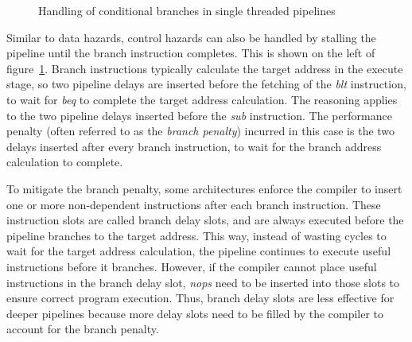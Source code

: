 \begin{figure}
\begin{center}
\noindent{}
\end{center}
\vspace{-3mm}
\caption{Handling of conditional branches in single threaded pipelines}
\label{fig:branch_execution_non_interleaved_pipeline}
\end{figure}

Similar to data hazards, control hazards can also be handled by stalling the pipeline until the branch instruction completes. 
This is shown on the left of figure~\ref{fig:branch_execution_non_interleaved_pipeline}. 
Branch instructions typically calculate the target address in the execute stage, so two pipeline delays are inserted before the fetching of the \emph{blt} instruction, to wait for \emph{beq} to complete the target address calculation. 
The reasoning applies to the two pipeline delays inserted before the \emph{sub} instruction. 
The performance penalty (often referred to as the \emph{branch penalty}) incurred in this case is the two delays inserted after every branch instruction, to wait for the branch address calculation to complete.

To mitigate the branch penalty, some architectures enforce the compiler to insert one or more non-dependent instructions after each branch instruction.
These instruction slots are called branch delay slots, and are always executed before the pipeline branches to the target address. 
This way, instead of wasting cycles to wait for the target address calculation, the pipeline continues to execute useful instructions before it branches.
However, if the compiler cannot place useful instructions in the branch delay slot, \emph{nops} need to be inserted into those slots to ensure correct program execution.
Thus, branch delay slots are less effective for deeper pipelines because more delay slots need to be filled by the compiler to account for the branch penalty.
  
